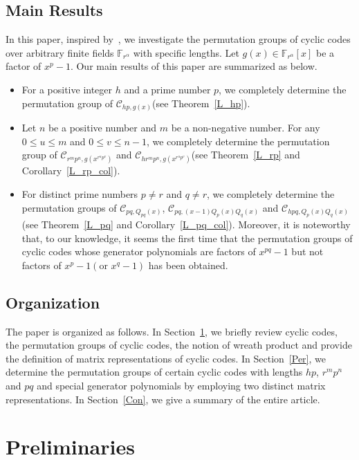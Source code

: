 \documentclass[journal,12pt,onecolumn]{IEEEtran}
\begin{document}
\subsection{Main Results}
In this paper, inspired by~\cite{maAutomorphismGroupsBinary2025}, we investigate the permutation groups of cyclic codes over arbitrary finite fields $\mathbb{F}_{r^\alpha}$ with specific lengths. Let $g(x)\in\mathbb{F}_{r^\alpha}[x]$ be a factor of $x^p-1$. Our main results of this paper are summarized as below.
\begin{itemize}
    \item For a positive integer $h$ and a prime number $p$, we completely determine the permutation group of $\mathcal{C}_{hp,g(x)}$(see Theorem~\ref{L_hp}). 
    \item Let $n$ be a positive number and $m$ be a non-negative number. For any $0\le u\le m$ and $0\le v\le n-1$, we completely determine the permutation group of $\mathcal{C}_{r^mp^n,g(x^{r^up^v})}$ and $\mathcal{C}_{hr^mp^n,g(x^{r^up^v})}$(see Theorem~\ref{L_rp} and Corollary~\ref{L_rp_col}). 
    \item For distinct prime numbers $p\neq r$ and $q\neq r$, we completely determine the permutation groups of $\mathcal{C}_{pq,Q_{pq}(x)}$, $\mathcal{C}_{pq,(x-1)Q_p(x)Q_q(x)}$ and $\mathcal{C}_{hpq,Q_p(x)Q_q(x)}$(see Theorem~\ref{L_pq} and Corollary~\ref{L_pq_col}). Moreover, it is noteworthy that, to our knowledge, it seems the first time that the permutation groups of cyclic codes whose generator polynomials are factors of $x^{pq}-1$ but not factors of $x^p-1(\text{or }x^q-1)$ has been obtained.
\end{itemize}




\subsection{Organization}
The paper is organized as follows. In Section~\ref{pre}, we briefly review cyclic codes, the permutation groups of cyclic codes, the notion of wreath product and provide the definition of matrix representations of cyclic codes. In Section~\ref{Per}, we determine the permutation groups of certain cyclic codes with lengths $hp$, $r^mp^n$ and $pq$ and special generator polynomials by employing two distinct matrix representations. In Section~\ref{Con}, we give a summary of the entire article.


\section{Preliminaries}\label{pre}
\end{document}
